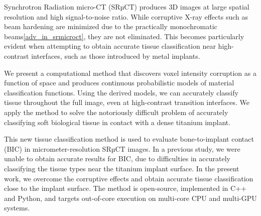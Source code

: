 Synchrotron Radiation micro-CT (SRµCT) produces 3D images at large spatial
resolution and high signal-to-noise ratio.  While corruptive X-ray effects such
as beam hardening are minimized due to the practically monochromatic
beams\ref{adv_in_srmicroct}, they are not eliminated. This becomes particularly
evident when attempting to obtain accurate tissue classification near
high-contrast interfaces, such as those introduced by metal implants.

We present a computational method that discovers voxel intensity corruption as
a function of space and produces continuous probabilistic models of material
classification functions. Using the derived models, we can accurately classify
tissue throughout the full image, even at high-contrast transition interfaces.
We apply the method to solve the notoriously difficult problem of accurately
classifying soft biological tissue in contact with a dense titanium implant.

This new tissue classification method is used to evaluate bone-to-implant
contact (BIC) in micrometer-resolution SRµCT images. In a previous study, we
were unable to obtain accurate results for BIC, due to difficulties in
accurately classifying the tissue types near the titanium implant surface. In
the present work, we overcome the corruptive effects and obtain accurate tissue
classification close to the implant surface.
The method is open-source, implemented in C++ and Python, and targets
out-of-core execution on multi-core CPU and multi-GPU systems.


